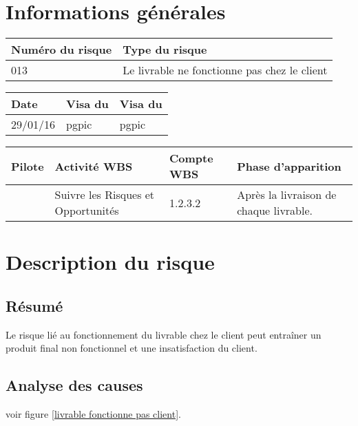 
\section*{Informations générales}

\begin{table}[H]
\centering
	\begin{tabularx}{16.8cm}{|X|X|}
	\hline
	\rowcolor{gray!40} Numéro du risque & Type du risque \\
	\hline
	013 & Le livrable ne fonctionne pas chez le client \\
	\hline
	\end{tabularx}
\end{table}

\begin{table}[H]
\centering
	\begin{tabularx}{16.8cm}{|X|X|X|}
	\hline
	\rowcolor{gray!40} Date & Visa du \RQ & Visa du \CP \\
	\hline
	 29/01/16 & pgpic & pgpic \\
	\hline
	\end{tabularx}
\end{table}

\begin{table}[H]
\centering
	\begin{tabularx}{16.8cm}{|X|X|X|X|}
	\hline
	\rowcolor{gray!40} Pilote & Activité WBS & Compte WBS & Phase d'apparition \\
	\hline
	 \Melissa & Suivre les Risques et Opportunités & 1.2.3.2 & Après la livraison de chaque livrable. \\
	\hline
	\end{tabularx}
\end{table}

\section*{Description du risque}

\subsection*{Résumé}
	Le risque lié au fonctionnement du livrable chez le client peut entraîner un produit final non fonctionnel et une insatisfaction du client.
	
\subsection*{Analyse des causes}
	voir figure \ref{livrable fonctionne pas client}.

